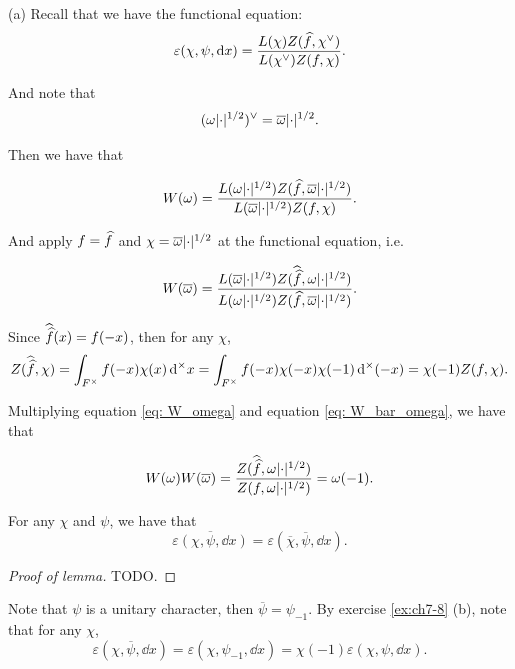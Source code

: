 \begin{solution}
  (a) Recall that we have the functional equation:
  \[\varepsilon(\chi, \psi, \mathop{}\!\mathrm{d} x) = \frac{L(\chi) Z(\widehat{f}, \chi^\vee)}{L(\chi^\vee) Z(f, \chi)}.  \]

  And note that
  \[(\omega \lvert\cdot\rvert ^{1/2})^\vee = \overline{\omega} \lvert\cdot\rvert^{1/2}.  \]

  Then we have that

  \begin{equation}
  W(\omega) = \frac{L(\omega \lvert\cdot\rvert ^{1/2}) Z(\widehat{f},
    \overline{\omega} \lvert\cdot\rvert^{1/2})}{L(\overline{\omega} \lvert\cdot\rvert^{1/2}) Z(f, \chi)}.
  \label{eq: W_omega}
  \end{equation}

  And apply $f = \widehat{f}$ and $\chi = \overline{\omega}\lvert\cdot\rvert^{1/2}$ at the functional equation, i.e.

  \begin{equation}
  W(\overline{\omega}) = \frac{L(\overline{\omega}\lvert\cdot\rvert^{1/2}) Z(\widehat{\widehat{f}},
  \omega \lvert\cdot\rvert^{1/2})}{L(\omega \lvert\cdot\rvert^{1/2}) Z(\widehat{f}, \overline{\omega} \lvert\cdot\rvert^{1/2})}.
  \label{eq: W_bar_omega}
  \end{equation}

  Since $\widehat{\widehat{f}} (x) = f(-x)$, then for any $\chi$,
  \[Z(\widehat{\widehat{f}}, \chi) = \int_{F^\times} f(-x) \chi(x) \mathop{}\!\mathrm{d}^\times x =
  \int_{F^\times} f(-x) \chi(-x) \chi(-1) \mathop{}\!\mathrm{d}^\times (-x) = \chi(-1) Z(f, \chi).  \]

  Multiplying equation \eqref{eq: W_omega} and equation \eqref{eq: W_bar_omega}, we have that

  \begin{equation}
    W(\omega) W(\overline{\omega}) = \frac{Z(\widehat{\widehat{f}}, \omega \lvert\cdot\rvert^{1/2})}{Z(f, \omega \lvert\cdot\rvert^{1/2})} =
  \omega(-1).
  \label{eq:Ww_Ww}
  \end{equation}

  \begin{lemma}
    For any $\chi$ and $\psi$, we have that
    \[\overline{\varepsilon (\chi, \psi, \dd x)} = \varepsilon(\overline{\chi}, \overline{\psi}, \dd x).\]
  \end{lemma}

  \begin{proof}[Proof of lemma]
    TODO.
  \end{proof}

  Note that $\psi$ is a unitary character, then $\overline{\psi} = \psi_{-1}$.
  By exercise \ref{ex:ch7-8} (b), note that for any $\chi$,
  \[\varepsilon(\chi, \overline{\psi}, \dd x) = \varepsilon(\chi, \psi_{-1}, \dd x) =
  \chi(-1) \varepsilon(\chi, \psi, \dd x).  \]


\end{solution}
